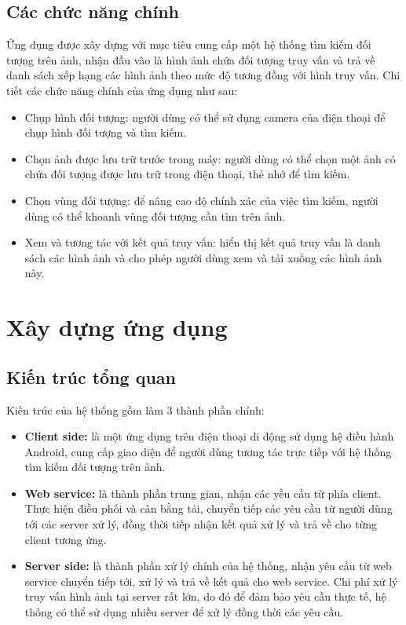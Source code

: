 	\subsection{Các chức năng chính}
Ứng dụng được xây dựng với mục tiêu cung cấp một hệ thống tìm kiếm đối tượng trên ảnh, nhận đầu vào là hình ảnh chứa đối tượng truy vấn và trả về danh sách xếp hạng các hình ảnh theo mức độ tương đồng với hình truy vấn. Chi tiết các chức năng chính của ứng dụng như sau:

\begin{itemize}

\item Chụp hình đối tượng: người dùng có thể sử dụng camera của điện thoại để chụp hình đối tượng và tìm kiếm.

\item Chọn ảnh được lưu trữ trước trong máy: người dùng có thể chọn một ảnh có chứa đối tượng được lưu trữ trong điện thoại, thẻ nhớ để tìm kiếm.

\item Chọn vùng đối tượng: để nâng cao độ chính xác của việc tìm kiếm, người dùng có thể khoanh vùng đối tượng cần tìm trên ảnh.

\item Xem và tương tác với kết quả truy vấn: hiển thị kết quả truy vấn là danh sách các hình ảnh và cho phép người dùng xem và tải xuống các hình ảnh này.

\end{itemize}

\section{Xây dựng ứng dụng}
\label{c5-thietke}

	\subsection{Kiến trúc tổng quan}
Kiến trúc của hệ thống gồm làm 3 thành phần chính:

\begin{itemize}

\item \textbf{Client side:} là một ứng dụng trên điện thoại di động sử dụng hệ điều hành Android, cung cấp giao diện để người dùng tương tác trực tiếp với hệ thống tìm kiếm đối tượng trên ảnh.

\item \textbf{Web service:} là thành phần trung gian, nhận các yều cầu từ phía client. Thực hiện điều phối và cân bằng tải, chuyển tiếp các yêu cầu từ người dùng tới các server xử lý, đồng thời tiếp nhận kết quả xử lý và trả về cho từng client tương ứng.

\item \textbf{Server side:} là thành phần xử lý chính của hệ thống, nhận yêu cầu từ web service chuyển tiếp tới, xử lý và trả về kết quả cho web service. Chi phí xử lý truy vấn hình ảnh tại server rất lớn, do đó để đảm bảo yêu cầu thực tế, hệ thống có thể sử dụng nhiều server để xử lý đồng thời các yêu cầu.

\end{itemize}

